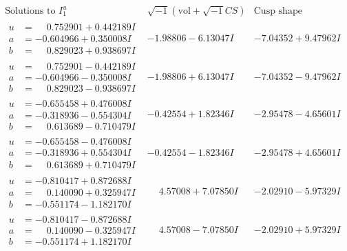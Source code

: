 \documentclass[1p]{elsarticle_modified}
\theoremstyle{definition}
\newcommand{\I}{\sqrt{-1}}
\begin{document}
$$\begin{array}{c|c|c}  
\text{Solutions to }I^u_{1}& \I (\text{vol} + \sqrt{-1}CS) & \text{Cusp shape}\\
 \hline 
\begin{aligned}
u &= \phantom{-}0.752901 + 0.442189 I \\
a &= -0.604966 + 0.350008 I \\
b &= \phantom{-}0.829023 + 0.938697 I\end{aligned}
 & -1.98806 - 6.13047 I & -7.04352 + 9.47962 I \\ \hline\begin{aligned}
u &= \phantom{-}0.752901 - 0.442189 I \\
a &= -0.604966 - 0.350008 I \\
b &= \phantom{-}0.829023 - 0.938697 I\end{aligned}
 & -1.98806 + 6.13047 I & -7.04352 - 9.47962 I \\ \hline\begin{aligned}
u &= -0.655458 + 0.476008 I \\
a &= -0.318936 - 0.554304 I \\
b &= \phantom{-}0.613689 - 0.710479 I\end{aligned}
 & -0.42554 + 1.82346 I & -2.95478 - 4.65601 I \\ \hline\begin{aligned}
u &= -0.655458 - 0.476008 I \\
a &= -0.318936 + 0.554304 I \\
b &= \phantom{-}0.613689 + 0.710479 I\end{aligned}
 & -0.42554 - 1.82346 I & -2.95478 + 4.65601 I \\ \hline\begin{aligned}
u &= -0.810417 + 0.872688 I \\
a &= \phantom{-}0.140090 + 0.325947 I \\
b &= -0.551174 - 1.182170 I\end{aligned}
 & \phantom{-}4.57008 + 7.07850 I & -2.02910 - 5.97329 I \\ \hline\begin{aligned}
u &= -0.810417 - 0.872688 I \\
a &= \phantom{-}0.140090 - 0.325947 I \\
b &= -0.551174 + 1.182170 I\end{aligned}
 & \phantom{-}4.57008 - 7.07850 I & -2.02910 + 5.97329 I \\ \hline\begin{aligned}

\end{aligned}
\end{array}$$
\end{document}
